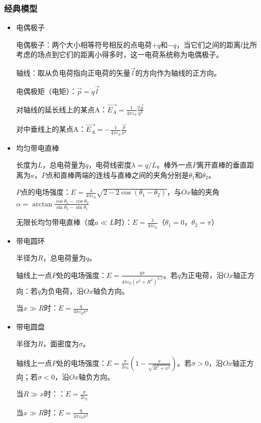 \subsubsection{经典模型}
\begin{itemize}
	\item 电偶极子
	
	电偶极子：两个大小相等符号相反的点电荷$+q$和$-q$，当它们之间的距离$l$比所考虑的场点到它们的距离小得多时，这一电荷系统称为电偶极子。
	
	轴线：取从负电荷指向正电荷的矢量$\vec{l}$的方向作为轴线的正方向。
	
	电偶极矩（电矩）：$\vec{p}=q\vec{l}$
	
	对轴线的延长线上的某点A：$\vec{E_A}=\frac{1}{4\pi\varepsilon_0}\frac{2\vec{p}}{y^3}$
	
	对中垂线上的某点A：$\vec{E_A}=-\frac{1}{4\pi\varepsilon_0}\frac{\vec{p}}{x^3}$
	
	\item  均匀带电直棒
	
	长度为$L$，总电荷量为$q$，电荷线密度$\lambda=q/L$。棒外一点$P$离开直棒的垂直距离为$a$，$P$点和直棒两端的连线与直棒之间的夹角分别是$\theta_1$和$\theta_2$。
	
	$P$点的电场强度：$E=\frac{\lambda}{4\pi\varepsilon_0}\sqrt{2-2\cos(\theta_1-\theta_2)}$，与$Ox$轴的夹角$\alpha=\arctan\frac{\cos\theta_1-\cos\theta_2}{\sin\theta_2-\sin\theta_1}$
	
	无限长均匀带电直棒（或$a\ll L$时）：$E=\frac{\lambda}{4\pi\varepsilon_0}$（$\theta_1=0$，$\theta_2=\pi$）
	
	\item 带电圆环
	
	半径为$R$，总电荷量为$q$。
	
	轴线上一点$P$处的电场强度：$E=\frac{qx}{4\pi\varepsilon_0(x^2+R^2)^{3/2}}$。若$q$为正电荷，沿$Ox$轴正方向：若$q$为负电荷，沿$Ox$轴负方向。
	
	当$x\gg R$时：$E=\frac{q}{4\pi\varepsilon_0 x^2}$
	
	\item 带电圆盘
	
	半径为$R$，面密度为$\sigma$。
	
	轴线上一点$P$处的电场强度：$E=\frac{\sigma}{2\varepsilon_0}(1-\frac{x}{\sqrt{R^2+x^2}})$。若$\sigma>0$，沿$Ox$轴正方向；若$\sigma<0$，沿$Ox$轴负方向。
	
	当$R\gg x$时：：$E=\frac{\sigma}{2\varepsilon_0}$
	
	当$x\gg R$时：$E=\frac{q}{4\pi\varepsilon_0 x^2}$
\end{itemize}

